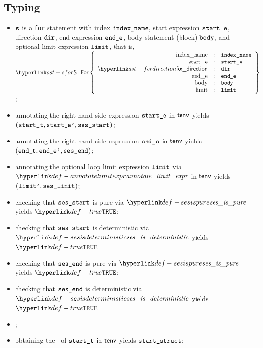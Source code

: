 \subsection{Typing}
\ProseParagraph
\AllApply
\begin{itemize}
  \item $\texttt{s}$ is a \texttt{for} statement with index $\texttt{index\_name}$,
        start expression $\texttt{start\_e}$,
        direction $\texttt{dir}$,
        end expression $\texttt{end\_e}$,
        body statement (block) $\texttt{body}$,
        and optional limit expression $\texttt{limit}$,
        that is, $\SFor\left\{\begin{array}{rcl}
          \Forindexname &:& \vindexname\\
          \Forstarte &:& \vstarte\\
          \fordirection &:& \vdir\\
          \Forende &:& \vende\\
          \Forbody &:& \vbody\\
          \Forlimit &:& \vlimit
        \end{array}\right\}$;
  \item annotating the right-hand-side expression $\texttt{start\_e}$ in $\textsf{tenv}$ yields \\
        $(\texttt{start\_t}, \texttt{start\_e'}, \texttt{ses\_start})$\ProseOrTypeError;
  \item annotating the right-hand-side expression $\texttt{end\_e}$ in $\textsf{tenv}$ yields \\ $(\texttt{end\_t}, \texttt{end\_e'}, \texttt{ses\_end})$\ProseOrTypeError;
  \item annotating the optional loop limit expression $\texttt{limit}$ via $\annotatelimitexpr$ in $\textsf{tenv}$
        yields $(\texttt{limit'}, \texttt{ses\_limit})$\ProseOrTypeError;
  \item checking that $\texttt{ses\_start}$ is pure via $\sesispure$ yields $\True$\ProseOrTypeError;
  \item checking that $\texttt{ses\_start}$ is deterministic via $\sesisdeterministic$ yields $\True$\ProseOrTypeError;
  \item checking that $\texttt{ses\_end}$ is pure via $\sesispure$ yields $\True$\ProseOrTypeError;
  \item checking that $\texttt{ses\_end}$ is deterministic via $\sesisdeterministic$ yields $\True$\ProseOrTypeError;
  \item {};
  \item obtaining the \underlyingtype\ of $\texttt{start\_t}$ in $\textsf{tenv}$ yields $\texttt{start\_struct}$\ProseOrTypeError;

\end{itemize}
